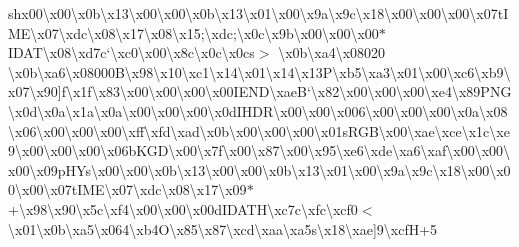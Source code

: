 sh{}x00\textbackslash{}x00\textbackslash{}x0b\textbackslash{}x13\textbackslash{}x00\textbackslash{}x00\textbackslash{}x0b\textbackslash{}x13\textbackslash{}x01\textbackslash{}x00\textbackslash{}x9a\textbackslash{}x9c\textbackslash{}x18\textbackslash{}x00\textbackslash{}x00\textbackslash{}x00\textbackslash{}x07t\+I\+M\+E\textbackslash{}x07\textbackslash{}xdc\textbackslash{}x08\textbackslash{}x17\textbackslash{}x08\textbackslash{}x15;\textbackslash{}xdc;\textbackslash{}x0c\textbackslash{}x9b\textbackslash{}x00\textbackslash{}x00\textbackslash{}x00$\ast$\+I\+D\+A\+T\textbackslash{}x08\textbackslash{}xd7c`\textbackslash{}xc0\textbackslash{}x00\textbackslash{}x8c\textbackslash{}x0c\textbackslash{}x0cs$>$ \textbackslash{}x0b\textbackslash{}xa4\textbackslash{}x08020 \textbackslash{}x0b\textbackslash{}xa6\textbackslash{}x08000\+B\textbackslash{}x98\textbackslash{}x10\textbackslash{}xc1\textbackslash{}x14\textbackslash{}x01\textbackslash{}x14\textbackslash{}x13\+P\textbackslash{}xb5\textbackslash{}xa3\textbackslash{}x01\textbackslash{}x00\textbackslash{}xc6\textbackslash{}xb9\textbackslash{}x07\textbackslash{}x90\mbox{]}f\textbackslash{}x1f\textbackslash{}x83\textbackslash{}x00\textbackslash{}x00\textbackslash{}x00\textbackslash{}x00\+I\+E\+N\+D\textbackslash{}xae\+B`\textbackslash{}x82\textbackslash{}x00\textbackslash{}x00\textbackslash{}x00\textbackslash{}xe4\textbackslash{}x89\+P\+N\+G\textbackslash{}x0d\textbackslash{}x0a\textbackslash{}x1a\textbackslash{}x0a\textbackslash{}x00\textbackslash{}x00\textbackslash{}x00\textbackslash{}x0d\+I\+H\+D\+R\textbackslash{}x00\textbackslash{}x00\textbackslash{}x006\textbackslash{}x00\textbackslash{}x00\textbackslash{}x00\textbackslash{}x0a\textbackslash{}x08\textbackslash{}x06\textbackslash{}x00\textbackslash{}x00\textbackslash{}x00\textbackslash{}xff\textbackslash{}xfd\textbackslash{}xad\textbackslash{}x0b\textbackslash{}x00\textbackslash{}x00\textbackslash{}x00\textbackslash{}x01s\+R\+G\+B\textbackslash{}x00\textbackslash{}xae\textbackslash{}xce\textbackslash{}x1c\textbackslash{}xe9\textbackslash{}x00\textbackslash{}x00\textbackslash{}x00\textbackslash{}x06b\+K\+G\+D\textbackslash{}x00\textbackslash{}x7f\textbackslash{}x00\textbackslash{}x87\textbackslash{}x00\textbackslash{}x95\textbackslash{}xe6\textbackslash{}xde\textbackslash{}xa6\textbackslash{}xaf\textbackslash{}x00\textbackslash{}x00\textbackslash{}x00\textbackslash{}x09p\+H\+Ys\textbackslash{}x00\textbackslash{}x00\textbackslash{}x0b\textbackslash{}x13\textbackslash{}x00\textbackslash{}x00\textbackslash{}x0b\textbackslash{}x13\textbackslash{}x01\textbackslash{}x00\textbackslash{}x9a\textbackslash{}x9c\textbackslash{}x18\textbackslash{}x00\textbackslash{}x00\textbackslash{}x00\textbackslash{}x07t\+I\+M\+E\textbackslash{}x07\textbackslash{}xdc\textbackslash{}x08\textbackslash{}x17\textbackslash{}x09$\ast$+\textbackslash{}x98\textbackslash{}x90\textbackslash{}x5c\textbackslash{}xf4\textbackslash{}x00\textbackslash{}x00\textbackslash{}x00d\+I\+D\+A\+T\+H\textbackslash{}xc7c\textbackslash{}xfc\textbackslash{}xcf0$<$\textbackslash{}x01\textbackslash{}x0b\textbackslash{}xa5\textbackslash{}x064\textbackslash{}xb4\+O\textbackslash{}x85\textbackslash{}x87\textbackslash{}xcd\textbackslash{}xaa\textbackslash{}xa5s\textbackslash{}x18\textbackslash{}xae\mbox{]}9\textbackslash{}xcf\+H+5\textbacksla
